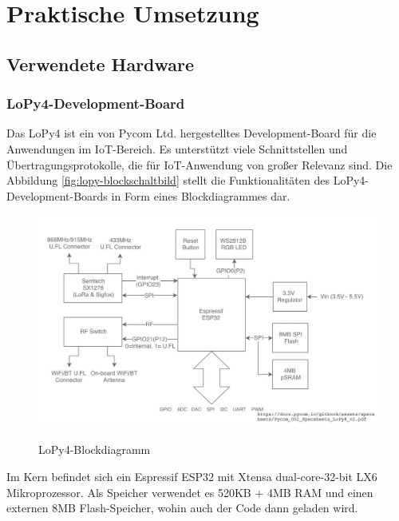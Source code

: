 
\chapter{Praktische Umsetzung} \label{Praktische Umsetzung}
\section{Verwendete Hardware} \label{Hardware}
\subsection{LoPy4-Development-Board} \label{LoPy4}

Das LoPy4 ist ein von Pycom Ltd. hergestelltes Development-Board für die Anwendungen im IoT-Bereich. Es unterstützt viele Schnittstellen und Übertragungsprotokolle, die für IoT-Anwendung von großer Relevanz sind. Die Abbildung \ref{fig:lopy-blockschaltbild} stellt die Funktionalitäten des LoPy4-Development-Boards in Form eines Blockdiagrammes  dar. 

\begin{figure}[h]
 \centering
 \includegraphics[width=1\textwidth]{pictures/blockdiagram_lopy}
 \caption[LoPy4-Blockdiagramm]{LoPy4-Blockdiagramm}\cite{Lopy2022}
 \label{fig:systemkonzept}
\end{figure}

Im Kern befindet sich ein Espressif ESP32 mit Xtensa dual-core-32-bit LX6 Mikroprozessor. Als Speicher verwendet es 520KB + 4MB RAM und einen externen 8MB Flash-Speicher, wohin auch der Code dann geladen wird. 

